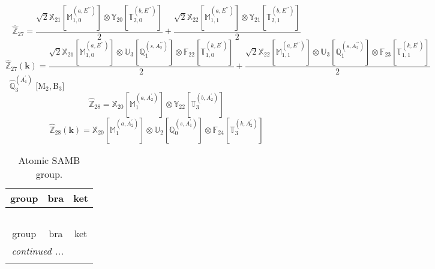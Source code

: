 \documentclass[fleqn,10pt,landscape]{article}
\begin{document}
\begin{itemize}
\begin{dmath*}
\hat{\mathbb{Z}}_{27}=\frac{\sqrt{2} \mathbb{X}_{21}[\mathbb{M}_{1,0}^{(a,E^{\prime\prime})}] \otimes\mathbb{Y}_{20}[\mathbb{T}_{2,0}^{(b,E^{\prime\prime})}]}{2} + \frac{\sqrt{2} \mathbb{X}_{22}[\mathbb{M}_{1,1}^{(a,E^{\prime\prime})}] \otimes\mathbb{Y}_{21}[\mathbb{T}_{2,1}^{(b,E^{\prime\prime})}]}{2}
\end{dmath*}
\begin{dmath*}
\hat{\mathbb{Z}}_{27}(\bm{k})=\frac{\sqrt{2} \mathbb{X}_{21}[\mathbb{M}_{1,0}^{(a,E^{\prime\prime})}] \otimes\mathbb{U}_{3}[\mathbb{Q}_{1}^{(s,A_{2}^{\prime\prime})}] \otimes\mathbb{F}_{22}[\mathbb{T}_{1,0}^{(k,E^{\prime})}]}{2} + \frac{\sqrt{2} \mathbb{X}_{22}[\mathbb{M}_{1,1}^{(a,E^{\prime\prime})}] \otimes\mathbb{U}_{3}[\mathbb{Q}_{1}^{(s,A_{2}^{\prime\prime})}] \otimes\mathbb{F}_{23}[\mathbb{T}_{1,1}^{(k,E^{\prime})}]}{2}
\end{dmath*}
\vspace{4mm}
\noindent {} $\,\,\,\hat{\mathbb{Q}}_{3}^{(A_{1}^{\prime})}$ [M$_{2}$,\,B$_{3}$]
\begin{dmath*}
\hat{\mathbb{Z}}_{28}=\mathbb{X}_{20}[\mathbb{M}_{1}^{(a,A_{2}^{\prime})}] \otimes\mathbb{Y}_{22}[\mathbb{T}_{3}^{(b,A_{2}^{\prime})}]
\end{dmath*}
\begin{dmath*}
\hat{\mathbb{Z}}_{28}(\bm{k})=\mathbb{X}_{20}[\mathbb{M}_{1}^{(a,A_{2}^{\prime})}] \otimes\mathbb{U}_{2}[\mathbb{Q}_{0}^{(s,A_{1}^{\prime})}] \otimes\mathbb{F}_{24}[\mathbb{T}_{3}^{(k,A_{2}^{\prime})}]
\end{dmath*}
\begin{center}
\renewcommand{\arraystretch}{1.3}
\begin{longtable}{c|c|c}
\caption{Atomic SAMB group.}
 \\
 \hline \hline
group & bra & ket \\ \hline \endfirsthead

\multicolumn{2}{l}{\tablename\ \thetable{}} \\
 \hline \hline
group & bra & ket \\ \hline \endhead

 \hline \hline
\multicolumn{2}{r}{\footnotesize\it continued ...} \\ \endfoot


\end{longtable}
\end{center}
\end{itemize}
\end{document}

